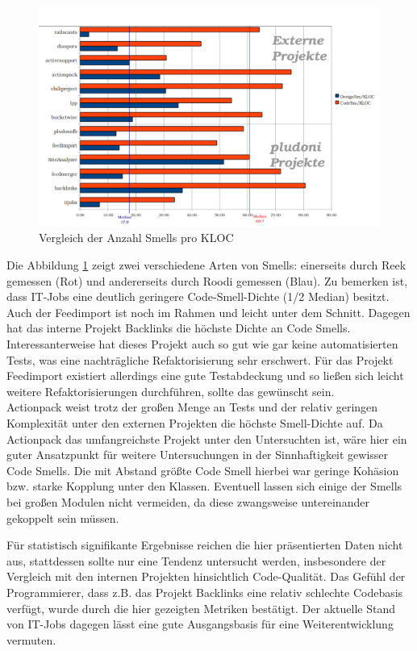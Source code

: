 \begin{figure}[htbp]
 \centering
 \includegraphics[width=\linewidth]{./diagrams/cpm-smells.pdf}
 \caption{Vergleich der Anzahl Smells pro KLOC}
 \label{fig:cpm-smells}
\end{figure}
Die Abbildung \ref{fig:cpm-smells} zeigt zwei verschiedene Arten von Smells: einerseits durch Reek gemessen (Rot) und andererseits durch Roodi gemessen (Blau). Zu bemerken ist, dass IT-Jobs eine deutlich geringere Code-Smell-Dichte (1/2 Median) besitzt. Auch der Feedimport ist noch im Rahmen und leicht unter dem Schnitt. Dagegen hat das interne Projekt Backlinks die höchste Dichte an Code Smells. Interessanterweise hat dieses Projekt auch so gut wie gar keine automatisierten Tests, was eine nachträgliche Refaktorisierung sehr erschwert. Für das Projekt Feedimport existiert allerdings eine gute Testabdeckung und so ließen sich leicht weitere Refaktorisierungen durchführen, sollte das gewünscht sein. \\
Actionpack weist trotz der großen Menge an Tests und der relativ geringen Komplexität unter den externen Projekten die höchste Smell-Dichte auf. Da Actionpack das umfangreichste Projekt unter den Untersuchten ist, wäre hier ein guter Ansatzpunkt für weitere Untersuchungen in der Sinnhaftigkeit gewisser Code Smells. Die mit Abstand größte Code Smell hierbei war geringe Kohäsion bzw. starke Kopplung unter den Klassen. Eventuell lassen sich einige der Smells bei großen Modulen nicht vermeiden, da diese zwangsweise untereinander gekoppelt sein müssen.



Für statistisch signifikante Ergebnisse reichen die hier präsentierten Daten nicht aus, stattdessen sollte nur eine Tendenz untersucht werden, insbesondere der Vergleich mit den internen Projekten hinsichtlich Code-Qualität. Das Gefühl der Programmierer, dass z.B. das Projekt Backlinks eine relativ schlechte Codebasis verfügt, wurde durch die hier gezeigten Metriken bestätigt. Der aktuelle Stand von IT-Jobs dagegen lässt eine gute Ausgangsbasis für eine Weiterentwicklung vermuten.


